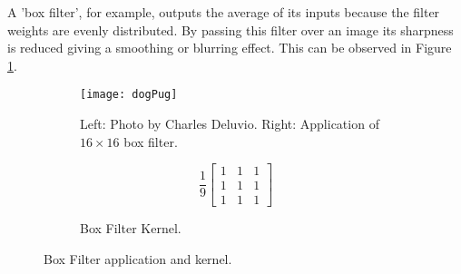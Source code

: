 A 'box filter', for example, outputs the average of its inputs because the filter weights are evenly distributed. By passing this filter over an image its sharpness is reduced giving a smoothing or blurring effect. This can be observed in Figure \ref{fig:roughDog}.

\begin{figure}[H]
  \centering
  \begin{subfigure}[b]{0.75\textwidth}
    \centering\texttt{[image: dogPug]}
    \caption{Left: Photo by Charles Deluvio. Right: Application of $16\times16$ box filter.}
    \label{fig:roughDog}
  \end{subfigure}
  \begin{subfigure}[b]{0.25\textwidth}
    \centering
    \[
      \frac{1}{9}
    \begin{bmatrix}
       1 & 1 & 1 \\
       1 & 1 & 1 \\
       1 & 1 & 1
    \end{bmatrix}
    \]
    \caption{Box Filter Kernel.}
    \label{fig:boxkernel}
  \end{subfigure}
  \caption{Box Filter application and kernel.}
  \label{fig:boxfilter}
\end{figure}





